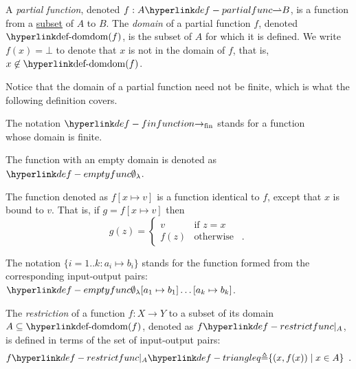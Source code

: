 \hypertarget{def-partialfunc}{}
\hypertarget{def-dom}{}
\begin{definition}
  A \emph{partial function}, denoted $f : A \partialto B$, is a function from a \underline{subset} of $A$ to $B$.
  The \emph{domain} of a partial function $f$, denoted $\dom(f)$, is the subset of $A$ for which it is defined.
  We write $f(x) = \bot$ to denote that $x$ is not in the domain of $f$, that is, $x \not\in \dom(f)$.
\end{definition}

Notice that the domain of a partial function need not be finite, which is what the following definition covers.

\hypertarget{def-finfunction}{}
\begin{definition}
The notation $\rightarrowfin$ stands for a function \\ whose domain is finite.
\end{definition}

\hypertarget{def-emptyfunc}{}
\begin{definition}
The function with an empty domain is denoted as $\emptyfunc$.
\end{definition}

\begin{definition}
  The function denoted as $f[x \mapsto v]$ is a function identical to $f$, except that $x$ is bound
  to $v$. That is, if  $g = f[x \mapsto v]$ then
  \[
    g(z) =
  \begin{cases}
    v     & \text{if } z = x\\
    f(z)  & \text{otherwise } \enspace.
  \end{cases}
  \]

  The notation $\{i=1..k: a_i\mapsto b_i\}$ stands for the function formed from the corresponding input-output pairs:
  $\emptyfunc[a_1\mapsto b_1]\ldots[a_k\mapsto b_k]$.
\end{definition}

\begin{definition}
\hypertarget{def-restrictfunc}{}
The \emph{restriction} of a function $f : X \rightarrow Y$ to a subset of its domain
$A \subseteq \dom(f)$, denoted as $\restrictfunc{f}{A}$, is defined
in terms of the set of input-output pairs:
\[
  \restrictfunc{f}{A} \triangleq \{ (x, f(x)) \;|\; x \in A \} \enspace.
\]
\end{definition}

